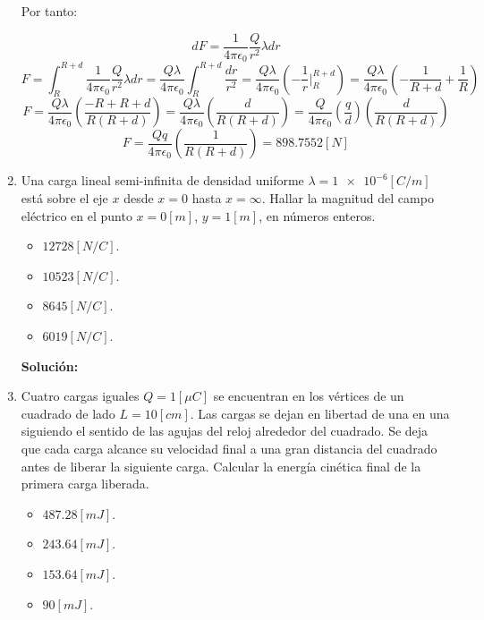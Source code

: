 \documentclass[letter,11pt]{article}
\begin{document}
\begin{enumerate}
Por tanto:

\begin{equation*}
    dF = \frac{1}{4\pi\epsilon_0}\frac{Q}{r^2}\lambda dr
\end{equation*}
\begin{equation*}
    F = \int_{R}^{R+d} \frac{1}{4\pi\epsilon_0}\frac{Q}{r^2}\lambda dr
      = \frac{Q\lambda}{4\pi\epsilon_0} \int_{R}^{R+d} \frac{dr}{r^2}
      = \frac{Q\lambda}{4\pi\epsilon_0}\left(
        -\frac{1}{r}\Biggr|_{R}^{R+d}\right)
      = \frac{Q\lambda}{4\pi\epsilon_0}\left(-\frac{1}{R+d}+\frac{1}{R}\right)
\end{equation*}
\begin{equation*}
    F = \frac{Q\lambda}{4\pi\epsilon_0}\left(\frac{-R+R+d}{R(R+d)}\right)
      = \frac{Q\lambda}{4\pi\epsilon_0}\left(\frac{d}{R(R+d)}\right)
      = \frac{Q}{4\pi\epsilon_0}\left(\frac{q}{d}\right)
        \left(\frac{d}{R(R+d)}\right)
\end{equation*}
\begin{equation*}
    F = \frac{Qq}{4\pi\epsilon_0}\left(\frac{1}{R(R+d)}\right)
      = 898.7552 [N]
\end{equation*}

\item Una carga lineal semi-infinita de densidad uniforme
$\lambda = \num{1e-6} [C/m]$ está sobre el eje $x$ desde $x = 0$ hasta
$x = \infty$. Hallar la magnitud del campo eléctrico en el punto $x = 0 [m]$,
$y = 1 [m]$, en números enteros.

\begin{itemize}
    \item $12728 [N/C]$.
    \item $10523 [N/C]$.
    \item $ 8645 [N/C]$.
    \item $ 6019 [N/C]$.
\end{itemize}

\textbf{Solución:}

\item Cuatro cargas iguales $Q = 1 [\mu C]$ se encuentran en los vértices de un
cuadrado de lado $L = 10 [cm]$. Las cargas se dejan en libertad de una en una
siguiendo el sentido de las agujas del reloj alrededor del cuadrado. Se deja que
cada carga alcance su velocidad final a una gran distancia del cuadrado antes de
liberar la siguiente carga. Calcular la energía cinética final de la primera
carga liberada.

\begin{itemize}
    \item $487.28 [mJ]$.
    \item $243.64 [mJ]$.
    \item $153.64 [mJ]$.
    \item $ 90    [mJ]$.
\end{itemize}


\end{enumerate}
\end{document}
